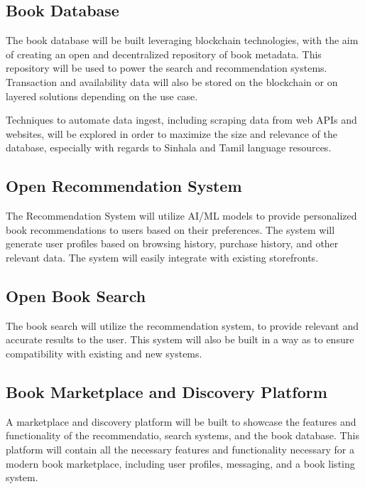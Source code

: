 \subsection*{Book Database}
The book database will be built leveraging blockchain technologies, with the aim of creating an
open and decentralized repository of book metadata. This repository will be used to power the
search and recommendation systems. Transaction and availability data will also be stored on the
blockchain or on layered solutions depending on the use case.

Techniques to automate data ingest, including scraping data from web APIs and websites, will be
explored in order to maximize the size and relevance of the database, especially with regards to
Sinhala and Tamil language resources.

\subsection*{Open Recommendation System}
The Recommendation System will utilize AI/ML models to provide personalized book recommendations
to users based on their preferences. The system will generate user profiles based on browsing
history, purchase history, and other relevant data. The system will easily integrate with existing
storefronts.

\subsection*{Open Book Search}
The book search will utilize the recommendation system, to provide relevant and accurate results
to the user. This system will also be built in a way as to ensure compatibility with existing and
new systems.

\subsection*{Book Marketplace and Discovery Platform}
A marketplace and discovery platform will be built to showcase the features and functionality of the
recommendatio, search systems, and the book database. This platform will contain all the necessary
features and functionality necessary for a modern book marketplace, including user profiles, messaging,
and a book listing system.


